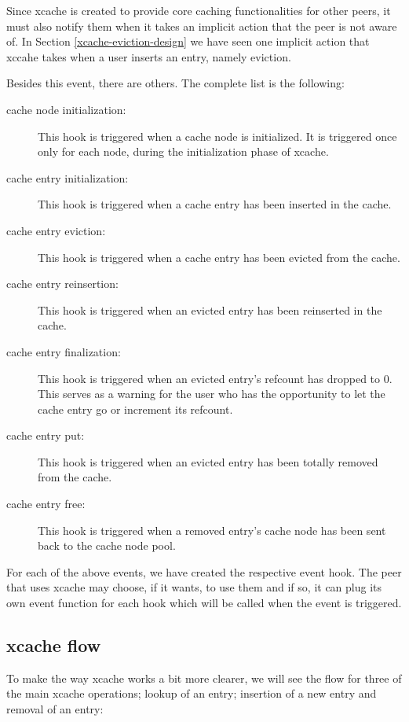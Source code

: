 Since xcache is created to provide core caching functionalities for other 
peers, it must also notify them when it takes an implicit action that the peer 
is not aware of. In Section \ref{xcache-eviction-design} we have seen one 
implicit action that xccahe takes when a user inserts an entry, namely 
eviction. 

Besides this event, there are others. The complete list is the following:

\begin{description}
\item[cache node initialization:]
	This hook is triggered when a cache node is initialized. It is 
	triggered once only for each node, during the initialization phase of 
	xcache.
\item[cache entry initialization:]
	This hook is triggered when a cache entry has been inserted in the 
	cache.
\item[cache entry eviction:]
	This hook is triggered when a cache entry has been evicted from the 
	cache.
\item[cache entry reinsertion:]
	This hook is triggered when an evicted entry has been reinserted in the 
	cache.
\item[cache entry finalization:]
	This hook is triggered when an evicted entry's refcount has dropped to 
	0. This serves as a warning for the user who has the opportunity to let 
	the cache entry go or increment its refcount.
\item[cache entry put:]
	This hook is triggered when an evicted entry has been totally removed 
	from the cache.
\item[cache entry free:]
	This hook is triggered when a removed entry's cache node has been sent 
	back to the cache node pool.
\end{description}

For each of the above events, we have created the respective event hook. The 
peer that uses xcache may choose, if it wants, to use them and if so, it can 
plug its own event function for each hook which will be called when the event 
is triggered.

\subsection{xcache flow}

To make the way xcache works a bit more clearer, we will see the flow for three 
of the main xcache operations; lookup of an entry; insertion of a new entry and 
removal of an entry:

